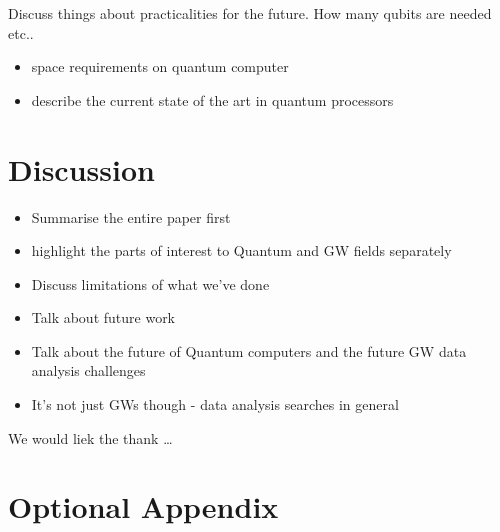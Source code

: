 \documentclass[aps,prd,nofootinbib,twocolumn,reprint,superscriptaddress,showpacs,showkeys,longbibliography]{revtex4-1}
\begin{document}
Discuss things about practicalities for the future. How many qubits are needed
etc.. 

\begin{itemize}
\item space requirements on quantum computer
\item describe the current state of the art in quantum processors
\end{itemize}

\section{Discussion}\label{sec:discussion}

\begin{itemize}
\item Summarise the entire paper first
\item highlight the parts of interest to Quantum and GW fields separately
\item Discuss limitations of what we've done
\item Talk about future work
\item Talk about the future of Quantum computers and the future GW data
analysis challenges
\item It's not just GWs though - data analysis searches in general
\end{itemize}

\begin{acknowledgments}
We would liek the thank \ldots
\end{acknowledgments}


\appendix

\section{Optional Appendix\label{sec:appendix}}



\end{document}

